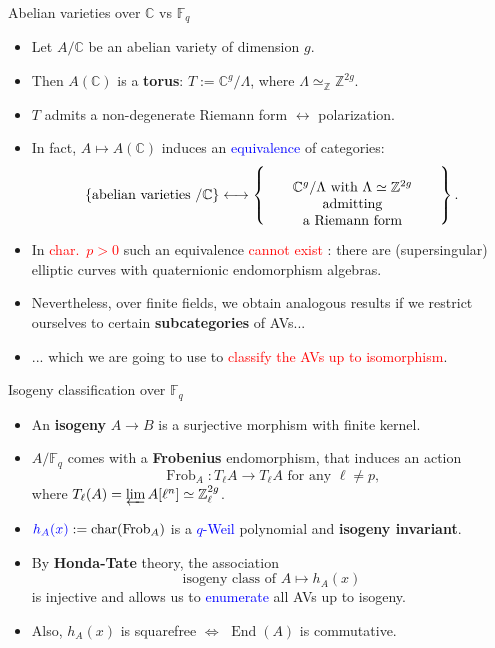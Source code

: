 \documentclass[usenames,dvipsnames,handout]{beamer}
\def\Z{\mathbb{Z}}
\def\C{\mathbb{C}}
\def\F{\mathbb{F}}
\DeclareMathOperator{\Char}{char}
\DeclareMathOperator{\Frob}{Frob}
\DeclareMathOperator{\End}{End}
\newcommand{\set}[1]{\left\lbrace#1\right\rbrace }
\newcommand{\red}[1]{\textcolor{red}{#1}}
\newcommand{\blue}[1]{\textcolor{blue}{#1}}
\begin{document}
\begin{frame}{ Abelian varieties over $\C$ vs $\F_q$ }    
    \begin{itemize}
     \item Let $A/\C$ be an abelian variety of dimension $g$. 
\pause
    \item Then $A(\C)$ is a {\bf torus}: $T:=\C^g/\Lambda$, where $\Lambda\simeq_\Z\Z^{2g}$.
\pause 
    \item $T$ admits a non-degenerate Riemann form $\longleftrightarrow$ polarization.
\pause
    \item In fact, $ A \mapsto A(\C)$ induces an \blue{equivalence} of categories:
    \vspace{-.2cm}
	  \[
      \set{ \text{abelian varieties $/\C$} } \longleftrightarrow 
      \set{\parbox[c]{12.5em}{\center $\C^g/\Lambda$ with $\Lambda\simeq \Z^{2g}$ admitting\\ a Riemann form}}.
     \]
\pause
    \vspace{-.5cm}
    \item In \red{char.~$p>0$} such an equivalence \red{cannot exist} : there are (supersingular) elliptic curves with quaternionic endomorphism algebras.
\pause 
    \item Nevertheless, over finite fields, we obtain analogous results if we restrict ourselves to certain {\bf subcategories} of AVs...
\pause
    \item ... which we are going to use to \red{classify the AVs up to isomorphism}.
	\end{itemize}
\end{frame}

\begin{frame}{ Isogeny classification over $\F_q$}
	\begin{itemize}
    \item An {\bf isogeny} $A\to B$ is a surjective morphism with finite kernel.
\pause     
    \item $A/\F_{q}$ comes with a {\bf Frobenius} endomorphism, 
\pause
    that induces an action
		\[ \Frob_A : T_\ell A \rightarrow T_\ell A \text{ for any }\ell\neq p, \]
		where $T_\ell(A) = \varprojlim A[\ell^n] \simeq \Z_\ell^{2g}$.
\pause
    \item $\blue{h_A(x)}:=\Char(\Frob_A)$ is a \blue{$q$-Weil} polynomial and {\bf isogeny invariant}.
\pause
    \item By {\bf Honda-Tate} theory, the association
		\[ \text{isogeny class of }A \longmapsto h_A(x) \]
		is injective and allows us to \blue{enumerate} all AVs up to isogeny.
\pause
    \item Also, $h_A(x)$ is squarefree $\iff$ $\End(A)$ is commutative.
	\end{itemize}
\end{frame}
\end{document}
